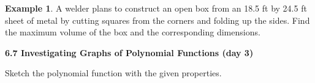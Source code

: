 \documentclass{report}
\theoremstyle{definition}
\newtheorem{example}{\bf Example}
\begin{document}
\vfill

\begin{example}
A welder plans to construct an open box from an 18.5 ft by 24.5 ft sheet of metal by cutting squares from the corners and folding up the sides. Find the maximum volume of the box and the corresponding dimensions.
\end{example}


\vfill

 \noindent{}

 \newpage

\noindent\Large\textbf{6.7 Investigating Graphs of Polynomial Functions (day 3)}\\\large

\noindent Sketch the polynomial function with the given properties.\normalsize\\
\end{document}
